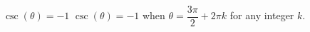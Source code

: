 {$\csc(\theta) = -1$}
{$\csc(\theta) = -1$ when $\theta = \dfrac{3\pi}{2} + 2\pi k$ for any integer $k$.}
